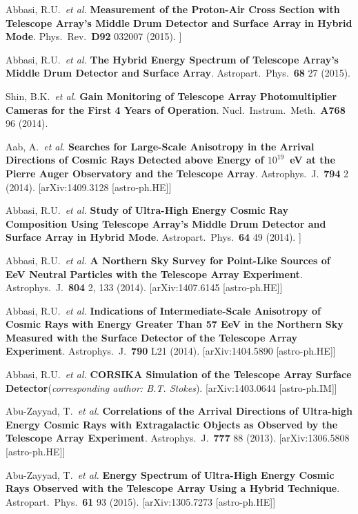 \begin{resume}
Abbasi, R.U.\ {\it et al.} {\bf Measurement of the Proton-Air Cross Section with Telescope Array’s Middle Drum Detector and Surface Array in Hybrid Mode}. Phys.\ Rev.\ {\bf D92} 032007 (2015). \newline
[arXiv:1505.01860 [astro-ph.HE]]

Abbasi, R.U.\ {\it et al.} {\bf The Hybrid Energy Spectrum of Telescope Array’s Middle Drum Detector and Surface Array}. Astropart.\ Phys.\ {\bf 68} 27 (2015). 

Shin, B.K.\ {\it et al.} {\bf Gain Monitoring of Telescope Array Photomultiplier Cameras for the First 4 Years of Operation}. Nucl.\ Instrum.\ Meth.\ {\bf A768} 96 (2014). 

Aab, A.\ {\it et al.} {\bf Searches for Large-Scale Anisotropy in the Arrival Directions of Cosmic Rays Detected above Energy of \boldmath$10^{19}$~eV at the Pierre Auger Observatory and the Telescope Array}. Astrophys.\ J.\ {\bf 794} 2 (2014). [arXiv:1409.3128 [astro-ph.HE]] 

Abbasi, R.U.\ {\it et al.} {\bf Study of Ultra-High Energy Cosmic Ray Composition Using Telescope Array's Middle Drum Detector and Surface Array in Hybrid Mode}. Astropart.\ Phys.\ {\bf 64} 49 (2014). \newline
[arXiv:1408.1726 [astro-ph.HE]]

Abbasi, R.U.\ {\it et al.} {\bf A Northern Sky Survey for Point-Like Sources of EeV Neutral Particles with the Telescope Array Experiment}. Astrophys.\ J.\ {\bf 804} 2, 133 (2014). [arXiv:1407.6145 [astro-ph.HE]]

Abbasi, R.U.\ {\it et al.} {\bf Indications of Intermediate-Scale Anisotropy of Cosmic Rays with Energy Greater Than 57 EeV in the Northern Sky Measured with the Surface Detector of the Telescope Array Experiment}. Astrophys.\ J.\ {\bf 790} L21 (2014). [arXiv:1404.5890 [astro-ph.HE]]

Abbasi, R.U.\ {\it et al.} {\bf CORSIKA Simulation of the Telescope Array Surface Detector}({\it corresponding author: B.T. Stokes}). [arXiv:1403.0644 [astro-ph.IM]]

Abu-Zayyad, T.\ {\it et al.} {\bf Correlations of the Arrival Directions of Ultra-high Energy Cosmic Rays with Extragalactic Objects as Observed by the Telescope Array Experiment}. Astrophys.\ J.\ {\bf 777} 88 (2013). [arXiv:1306.5808 [astro-ph.HE]]

Abu-Zayyad, T.\ {\it et al.} {\bf Energy Spectrum of Ultra-High Energy Cosmic Rays Observed with the Telescope Array Using a Hybrid Technique}. Astropart.\ Phys.\ {\bf 61} 93 (2015).  [arXiv:1305.7273 [astro-ph.HE]]


\end{resume}
